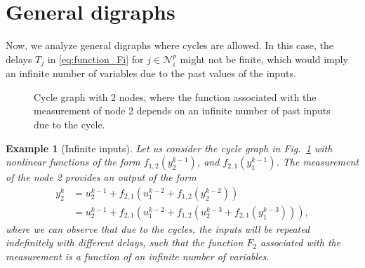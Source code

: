 \documentclass[letterpaper,10pt,journal]{IEEEtran}
\newtheorem{example}{Example}
\newcommand{\NN}{\mathcal{N}}
\begin{document}
\section{General digraphs}\label{sec:general_digraphs}



Now, we analyze general digraphs where cycles are allowed.
In this case, the delays $T_j$ in \eqref{eq:function_Fi} for $j\in\NN_i^p$ might not be finite, which would imply an infinite number of variables due to the past values of the inputs.


\begin{figure}[!t]
    \centering
    \caption{Cycle graph with 2 nodes, where the function associated with the measurement of node 2 depends on an infinite number of past inputs due to the cycle.}
    \label{fig:cycle_graph}
\end{figure}


\begin{example}[Infinite inputs]\label{ex:infinite_delays}
    Let us consider the cycle graph in Fig.~\ref{fig:cycle_graph} with nonlinear functions of the form $f_{1,2}(y_2^{k-1})$, and $f_{2,1}(y_1^{k-1})$. The measurement of the node 2 provides an output of the form
    \begin{align}
        y_2^k&=u_2^{k-1}+f_{2,1}(u_1^{k-2}+f_{1,2}(y_2^{k-2}))\label{eq:NARMAX_model}\\
        &=u_2^{k-1}+f_{2,1}(u_1^{k-2}+f_{1,2}(u_2^{k-3}+f_{2,1}(y_1^{k-3}))),\nonumber
    \end{align}
    where we can observe that due to the cycles, the inputs will be repeated indefinitely with different delays, such that the function $F_2$ associated with the measurement is a function of an infinite number of variables. 
\end{example}
\end{document}
